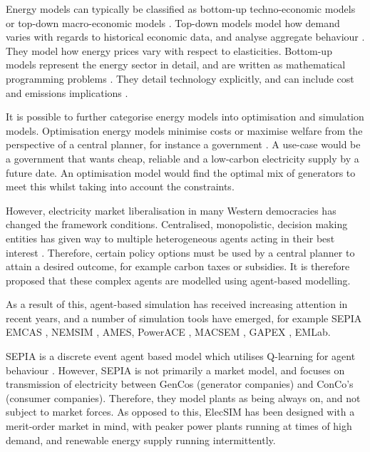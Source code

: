 
Energy models can typically be classified as bottom-up techno-economic models or top-down macro-economic models \cite{Bohringer1998}. Top-down models model how demand varies with regards to historical economic data, and analyse aggregate behaviour \cite{Hall2016}. They model how energy prices vary with respect to elasticities. Bottom-up models represent the energy sector in detail, and are written as mathematical programming problems \cite{Gargiulo2013}. They detail technology explicitly, and can include cost and emissions implications \cite{Hall2016}.

It is possible to further categorise energy models into optimisation and simulation models. Optimisation energy models minimise costs or maximise welfare from the perspective of a central planner, for instance a government \cite{Keles2017}. A use-case would be a government that wants cheap, reliable and a low-carbon electricity supply by a future date. An optimisation model would find the optimal mix of generators to meet this whilst taking into account the constraints. 

However, electricity market liberalisation in many Western democracies has changed the framework conditions. Centralised, monopolistic, decision making entities has given way to multiple heterogeneous agents acting in their best interest \cite{Most2010}. Therefore, certain policy options must be used by a central planner to attain a desired outcome, for example carbon taxes or subsidies. It is therefore proposed that these complex agents are modelled using agent-based modelling.

As a result of this, agent-based simulation has received increasing attention in recent years, and a number of simulation tools have emerged, for example SEPIA\cite{Kraan2018} EMCAS \cite{Conzelmann}, NEMSIM \cite{Batten2006}, AMES\cite{Sun2007}, PowerACE \cite{Rothengatter2007}, MACSEM \cite{Praca2003}, GAPEX  \cite{Cincotti2013}, EMLab\cite{Chappin2017}.

SEPIA is a discrete event agent based model which utilises Q-learning for agent behaviour \cite{Harp2000}. However, SEPIA is not primarily a market model, and focuses on transmission of electricity between GenCos (generator companies) and ConCo's (consumer companies). Therefore, they model plants as being always on, and not subject to market forces. As opposed to this, ElecSIM has been designed with a merit-order market in mind, with peaker power plants running at times of high demand, and renewable energy supply running intermittently.

